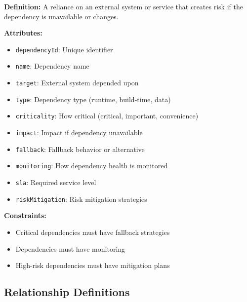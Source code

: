 \documentclass[11pt,letterpaper]{article}
\begin{document}
\begin{definitionbox}
\textbf{Definition:} A reliance on an external system or service that creates risk if the dependency is unavailable or changes.

\textbf{Attributes:}
\begin{itemize}[nosep]
    \item \texttt{dependencyId}: Unique identifier
    \item \texttt{name}: Dependency name
    \item \texttt{target}: External system depended upon
    \item \texttt{type}: Dependency type (runtime, build-time, data)
    \item \texttt{criticality}: How critical (critical, important, convenience)
    \item \texttt{impact}: Impact if dependency unavailable
    \item \texttt{fallback}: Fallback behavior or alternative
    \item \texttt{monitoring}: How dependency health is monitored
    \item \texttt{sla}: Required service level
    \item \texttt{riskMitigation}: Risk mitigation strategies
\end{itemize}

\textbf{Constraints:}
\begin{itemize}[nosep]
    \item Critical dependencies must have fallback strategies
    \item Dependencies must have monitoring
    \item High-risk dependencies must have mitigation plans
\end{itemize}
\end{definitionbox}

\subsection{Relationship Definitions}
\end{document}
